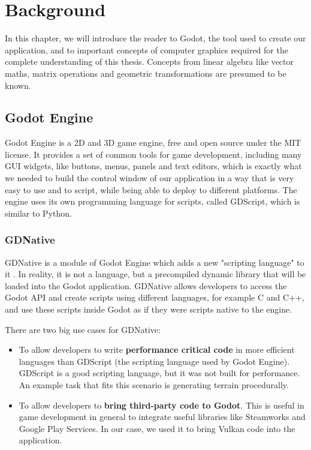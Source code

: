 \chapter{Background}


In this chapter, we will introduce the reader to Godot, the tool used to create our application, and to important concepts of computer graphics required for the complete understanding of this thesis. Concepts from linear algebra like vector maths, matrix operations and geometric transformations are presumed to be known.

\section{Godot Engine}
Godot Engine is a 2D and 3D game engine, free and open source under the MIT license. It provides a set of common tools for game development, including many GUI widgets, like buttons, menus, panels and text editors, which is exactly what we needed to build the control window of our application in a way that is very easy to use and to script, while being able to deploy to different platforms. The engine uses its own programming language for scripts, called GDScript, which is similar to Python.

\subsection{GDNative}
GDNative is a module of Godot Engine which adds a new "scripting language" to it \cite{gdnative_post}. In reality, it is not a language, but a precompiled dynamic library that will be loaded into the Godot application. GDNative allows developers to access the Godot API and create scripts using different languages, for example C and C++,  and use these scripts inside Godot as if they were scripts native to the engine.

There are two big use cases for GDNative:

\begin{itemize}
    \item To allow developers to write \textbf{performance critical code} in more efficient languages than GDScript (the scripting language used by Godot Engine). GDScript is a good scripting language, but it was not built for performance. An example task that fits this scenario is generating terrain procedurally.
    \item To allow developers to \textbf{bring third-party code to Godot}. This is useful in game development in general to integrate useful libraries like Steamworks and Google Play Services. In our case, we used it to bring Vulkan code into the application.
\end{itemize}


